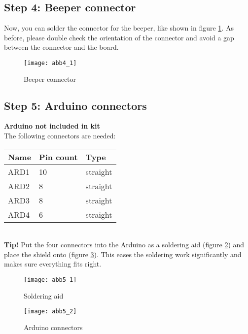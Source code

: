 \documentclass[fleqn,10pt]{SelfArx} %
\begin{document}
\FloatBarrier

 \subsection*{Step 4: Beeper connector}

Now, you can solder the connector for the beeper, like shown in figure \ref{fig:abb4_1}. As before, please double check the orientation of the connector and avoid a gap between the connector and the board.

\begin{figure}[tbhp]\centering
\texttt{[image: abb4\_1]}
\caption{Beeper connector}
\label{fig:abb4_1}
\end{figure}

\FloatBarrier

 \subsection*{Step 5: Arduino connectors}

\textbf{Arduino not included in kit}\\

The following connectors are needed:\\

\begin{tabular}{lll}
\hline
\textbf{Name} & \textbf{Pin count}  & \textbf{Type} \\ \hline
ARD1          & 10                & straight       \\ \hline
ARD2          & 8                 & straight       \\ \hline
ARD3          & 8                 & straight       \\ \hline
ARD4          & 6                 & straight       \\ \hline
\end{tabular}\\


\textbf{Tip!} Put the four connectors into the Arduino as a soldering aid (figure \ref{fig:abb5_1}) and place the shield onto (figure \ref{fig:abb5_2}). This eases the soldering work significantly and makes sure everything fits right.

\begin{figure}[tbhp]\centering
\texttt{[image: abb5\_1]}
\caption{Soldering aid}
\label{fig:abb5_1}
\end{figure}

\begin{figure}[tbhp]\centering
\texttt{[image: abb5\_2]}
\caption{Arduino connectors}
\label{fig:abb5_2}
\end{figure}
\end{document}
